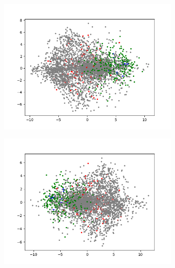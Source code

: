 \begin{figure}[H]
\begin{subfigure}{.25\textwidth}
        \includegraphics[width=\textwidth]{images/figures/experiments_latent/pooling_dim128_PCA_classes.png}
    \end{subfigure}%
    \begin{subfigure}{.25\textwidth}
        \centering
        \includegraphics[width=\textwidth]{images/figures/experiments_latent/pooling_dim50_PCA_classes.png}
    \end{subfigure}
    \begin{subfigure}{.25\textwidth}
        \centering

\end{subfigure}
\end{figure}

